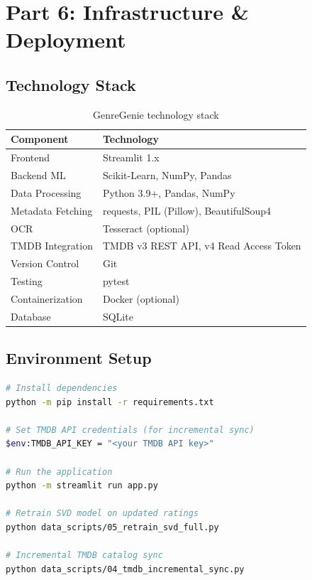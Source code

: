 \documentclass[11pt,a4paper]{article}
\begin{document}

\section{Part 6: Infrastructure \& Deployment}

\subsection{Technology Stack}

\begin{table}[H]
\centering
\begin{tabular}{ll}
\toprule
\textbf{Component} & \textbf{Technology} \\
\midrule
Frontend & Streamlit 1.x \\
Backend ML & Scikit-Learn, NumPy, Pandas \\
Data Processing & Python 3.9+, Pandas, NumPy \\
Metadata Fetching & requests, PIL (Pillow), BeautifulSoup4 \\
OCR & Tesseract (optional) \\
TMDB Integration & TMDB v3 REST API, v4 Read Access Token \\
Version Control & Git \\
Testing & pytest \\
Containerization & Docker (optional) \\
Database & SQLite \\
\bottomrule
\end{tabular}
\caption{GenreGenie technology stack}
\label{tab:tech_stack}
\end{table}

\subsection{Environment Setup}

\begin{lstlisting}[language=bash, caption=Installation and Execution]
# Install dependencies
python -m pip install -r requirements.txt

# Set TMDB API credentials (for incremental sync)
$env:TMDB_API_KEY = "<your TMDB API key>"

# Run the application
python -m streamlit run app.py

# Retrain SVD model on updated ratings
python data_scripts/05_retrain_svd_full.py

# Incremental TMDB catalog sync
python data_scripts/04_tmdb_incremental_sync.py
\end{lstlisting}
\end{document}
